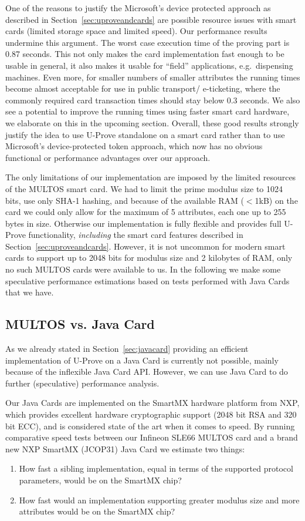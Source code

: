 One of the reasons to justify the Microsoft's device protected approach as
described in Section~\ref{sec:uproveandcards} are possible resource issues with
smart cards (limited storage space and limited speed). Our performance results
undermine this argument. The worst case execution time of the proving part is
0.87 seconds. This not only makes the card implementation fast enough to be
usable in general, it also makes it usable for ``field'' applications, e.g.\
dispensing machines. Even more, for smaller numbers of smaller attributes the
running times become almost acceptable for use in public transport\slash
e-ticketing, where the commonly required card transaction times should stay
below 0.3 seconds. We also see a potential to improve the running times using
faster smart card hardware, we elaborate on this in the upcoming section.
Overall, these good results strongly justify the idea to use U-Prove standalone
on a smart card rather than to use Microsoft's device-protected token approach,
which now has no obvious functional or performance advantages over our approach.

The only limitations of our implementation are imposed by the limited resources
of the MULTOS smart card. We had to limit the prime modulus size to 1024 bits,
use only SHA-1 hashing, and because of the available RAM ($<$1kB) on the card we
could only allow for the maximum of 5 attributes, each one up to 255 bytes in
size. Otherwise our implementation is fully flexible and provides full U-Prove
functionality, \emph{including} the smart card features described in
Section~\ref{sec:uproveandcards}. However, it is not uncommon for modern smart
cards to support up to 2048 bits for modulus size and 2 kilobytes of RAM, only
no such MULTOS cards were available to us. In the following we make some
speculative performance estimations based on tests performed with Java Cards
that we have.

\subsection{MULTOS vs. Java Card}

As we already stated in Section~\ref{sec:javacard} providing an efficient
implementation of U-Prove on a Java Card is currently not possible, mainly
because of the inflexible Java Card API. However, we can use Java Card to
do further (speculative) performance analysis.

Our Java Cards are implemented on the SmartMX hardware platform from
NXP, which provides excellent hardware cryptographic support (2048 bit
RSA and 320 bit ECC), and is considered state of the art when it
comes to speed. By running comparative speed tests between our Infineon
SLE66 MULTOS card and a brand new NXP SmartMX (JCOP31) Java Card we
estimate two things:
\begin{enumerate}
\item How fast a sibling implementation, equal in terms of the
  supported protocol parameters, would be on the SmartMX chip?
\item How fast would an implementation supporting greater modulus size
  and more attributes would be on the SmartMX chip?
\end{enumerate}

